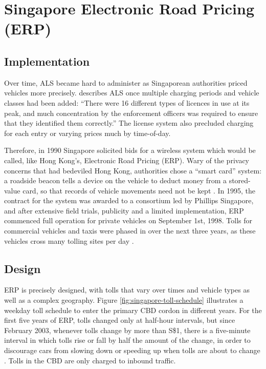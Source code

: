 \section{Singapore Electronic Road Pricing (ERP)}\label{sec:erp}

\subsection{Implementation}

Over time, ALS became hard to administer as Singaporean authorities priced vehicles more precisely. \citet[p. 4]{Chin2009} describes ALS once multiple charging periods and vehicle classes had been added: ``There were 16 different types of licences in use at its peak, and much concentration by the enforcement officers was required to ensure that they identified them correctly.'' The license system also precluded charging for each entry or varying prices much by time-of-day.

Therefore, in 1990 Singapore solicited bids for a wireless system which would be called, like Hong Kong's, Electronic Road Pricing (ERP). Wary of the privacy concerns that had bedeviled Hong Kong, authorities chose a ``smart card'' system: a roadside beacon tells a device on the vehicle to deduct money from a stored-value card, so that records of vehicle movements need not be kept \citep[p. 5]{Chin2009}. In 1995, the contract for the system was awarded to a consortium led by Phillips Singapore, and after extensive field trials, publicity and a limited implementation, ERP commenced full operation for private vehicles on September 1st, 1998. Tolls for commercial vehicles and taxis were phased in over the next three years, as these vehicles cross many tolling sites per day \citep[p. 64]{Menon2004}.

\subsection{Design}

ERP is precisely designed, with tolls that vary over times and vehicle types as well as a complex geography. Figure \ref{fig:singapore-toll-schedule} illustrates a weekday toll schedule to enter the primary CBD cordon in different years. For the first five years of ERP, tolls changed only at half-hour intervals, but since February 2003, whenever tolls change by more than S\$1, there is a five-minute interval in which tolls rise or fall by half the amount of the change, in order to discourage cars from slowing down or speeding up when tolls are about to change \citep{Menon2004}. Tolls in the CBD are only charged to inbound traffic. 

